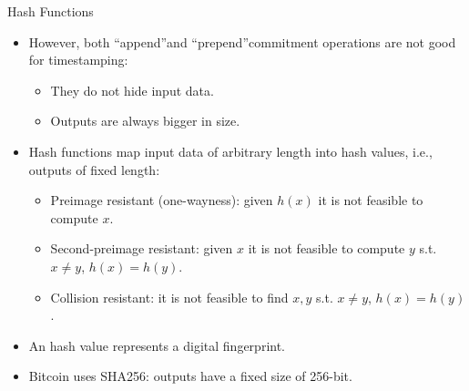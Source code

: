 \documentclass[usenames,dvipsnames]{beamer}
\begin{document}
    \begin{frame}{Hash Functions}
        \begin{itemize}
            \item However, both \textquotedblleft append\textquotedblright and \textquotedblleft prepend\textquotedblright commitment operations are \alert{not good} for timestamping:
            \begin{itemize}
                \item They do not \alert{hide} input data.
                \item Outputs are always \alert{bigger} in size.
            \end{itemize}
            \item \alert{Hash functions} map input data of \alert{arbitrary length} into hash values, i.e., outputs of \alert{fixed length}:
            \begin{itemize}
                \item \alert{Preimage resistant} (one-wayness): given $h(x)$ it is not feasible to compute $x$.
                \item \alert{Second-preimage resistant}: given $x$ it is not feasible to compute $y$ s.t. $x \neq y$, $h(x)=h(y)$.
                \item \alert{Collision resistant}: it is not feasible to find $x, y$ s.t. $x \neq y$, $h(x)=h(y)$.
            \end{itemize}
            \item An hash value represents a \alert{digital fingerprint}.
            \item Bitcoin uses \alert{SHA256}: outputs have a fixed size of 256-bit.
        \end{itemize}
    \end{frame}
    
\end{document}
